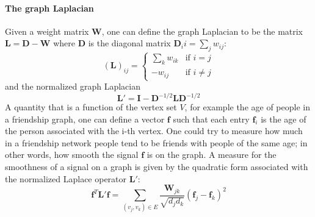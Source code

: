 \paragraph{The graph Laplacian}
Given a weight matrix $\mathbf W$, one can define the graph Laplacian to be the matrix $\mathbf L = \mathbf D-\mathbf W$ where $\mathbf D$ is the diagonal matrix $\mathbf D_ii = \sum_j w_{ij}$:
\begin{equation}\label{eq:graph Laplacian}
	(\mathbf{L})_{ij}=\begin{cases}
	\sum_k w_{ik} & \text{if }i=j\\
	-w_{ij}&\text{if }i\neq j
	\end{cases}
\end{equation}
and the normalized graph Laplacian
\begin{equation}\label{eq:normalized graph Laplacian}
\mathbf L' = \mathbf I - \mathbf D^{-1/2}\mathbf L\mathbf D^{-1/2}
\end{equation}
A quantity that is a function of the vertex set $V$, for example the age of people in a friendship graph, one can define a vector $\mathbf f$ such that each entry $\mathbf f_i$ is the age of the person associated with the i-th vertex. One could try to measure how much in a friendship network people tend to be friends with people of the same age; in other words, how smooth the signal $\mathbf f$ is on the graph. A measure for the smoothness of a signal on a graph is given by the quadratic form associated with the normalized Laplace operator $\mathbf L'$:
\begin{equation}\label{eq:quadratic form}
	\mathbf f^T \mathbf L' \mathbf f = \sum_{\left(v_{j}, v_{k}\right) \in {E}} \frac{\boldsymbol{W}_{j k}}{\sqrt{d_{j} {d}_{k}}}\left(\boldsymbol{f}_{j}-\boldsymbol{f}_{k}\right)^{2}
\end{equation}
